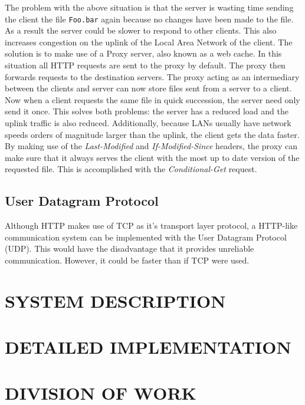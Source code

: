\documentclass[10pt,twocolumn]{witseiepaper}
\begin{document}
	The problem with the above situation is that the server is wasting time sending the client the file \verb|Foo.bar| again because no changes have been made to the file. As a result the server could be slower to respond to other clients. This also increases congestion on the uplink of the Local Area Network of the client. The solution is to make use of a Proxy server, also known as a web cache. In this situation all HTTP requests are sent to the proxy by default. The proxy then forwards requests to the destination servers. The proxy acting as an intermediary between the clients and server can now store files sent from a server to a client. Now when a client requests the same file in quick succession, the server need only send it once. This solves both problems: the server has a reduced load and the uplink traffic is also reduced. Additionally, because LANs usually have network speeds orders of magnitude larger than the uplink, the client gets the data faster. By making use of the \emph{Last-Modified} and \emph{If-Modified-Since} headers, the proxy can make sure that it always serves the client with the most up to date version of the requested file. This is accomplished with the \emph{Conditional-Get} request. 	

	\subsection{User Datagram Protocol}

	Although HTTP makes use of TCP as it's transport layer protocol, a HTTP-like communication system can be implemented with the User Datagram Protocol (UDP). This would have the disadvantage that it provides unreliable communication. However, it could be faster than if TCP were used.


\section{SYSTEM DESCRIPTION}

\section{DETAILED IMPLEMENTATION}

\section{DIVISION OF WORK}
\end{document}
